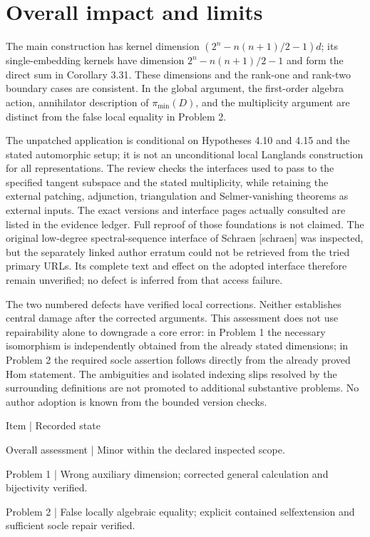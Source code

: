 \documentclass[10pt]{article}
\begin{document}
\section*{Overall impact and limits}
The main construction has kernel dimension \((2^n-n(n+1)/2-1)d\); its single-embedding kernels have dimension \(2^n-n(n+1)/2-1\) and form the direct sum in Corollary 3.31. These dimensions and the rank-one and rank-two boundary cases are consistent. In the global argument, the first-order algebra action, annihilator description of \(\pi_{\min}(D)\), and the multiplicity argument are distinct from the false local equality in Problem 2.\par
The unpatched application is conditional on Hypotheses 4.10 and 4.15 and the stated automorphic setup; it is not an unconditional local Langlands construction for all representations. The review checks the interfaces used to pass to the specified tangent subspace and the stated multiplicity, while retaining the external patching, adjunction, triangulation and Selmer-vanishing theorems as external inputs. The exact versions and interface pages actually consulted are listed in the evidence ledger. Full reproof of those foundations is not claimed. The original low-degree spectral-sequence interface of Schraen [schraen] was inspected, but the separately linked author erratum could not be retrieved from the tried primary URLs. Its complete text and effect on the adopted interface therefore remain unverified; no defect is inferred from that access failure.\par
The two numbered defects have verified local corrections. Neither establishes central damage after the corrected arguments. This assessment does not use repairability alone to downgrade a core error: in Problem 1 the necessary isomorphism is independently obtained from the already stated dimensions; in Problem 2 the required socle assertion follows directly from the already proved Hom statement. The ambiguities and isolated indexing slips resolved by the surrounding definitions are not promoted to additional substantive problems. No author adoption is known from the bounded version checks.\par
Item | Recorded state\par
Overall assessment | Minor within the declared inspected scope.\par
Problem 1 | Wrong auxiliary dimension; corrected general calculation and bijectivity verified.\par
Problem 2 | False locally algebraic equality; explicit contained selfextension and sufficient socle repair verified.\par
\end{document}
